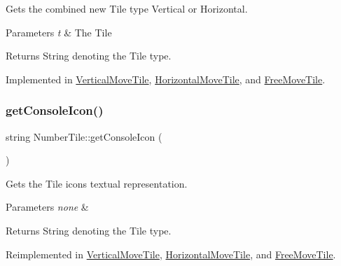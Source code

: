 Gets the combined new Tile type Vertical or Horizontal.


\begin{DoxyParams}{Parameters}
{\em t} & The Tile \\
\hline
\end{DoxyParams}
\begin{DoxyReturn}{Returns}
String denoting the Tile type. 
\end{DoxyReturn}


Implemented in \hyperlink{classVerticalMoveTile_a8a850a4df774c6132f20806ed531555a}{Vertical\+Move\+Tile}, \hyperlink{classHorizontalMoveTile_a90f17bebf2e3eb4ccdf20cd9b5c2bab6}{Horizontal\+Move\+Tile}, and \hyperlink{classFreeMoveTile_a4a0fa3466191647164cd39a5f4af4f29}{Free\+Move\+Tile}.

\mbox{\label{classNumberTile_a33a9dad43334d12c5b3842f1a45b1b66}} 
\subsubsection{\texorpdfstring{get\+Console\+Icon()}{getConsoleIcon()}}
{\footnotesize\ttfamily string Number\+Tile\+::get\+Console\+Icon (\begin{DoxyParamCaption}{ }\end{DoxyParamCaption})\hspace{0.3cm}{\ttfamily [virtual]}}

Gets the Tile icons textual representation.


\begin{DoxyParams}{Parameters}
{\em none} & \\
\hline
\end{DoxyParams}
\begin{DoxyReturn}{Returns}
String denoting the Tile type. 
\end{DoxyReturn}


Reimplemented in \hyperlink{classVerticalMoveTile_a0f313f3ba4d1cef0f91f7accd38a93ed}{Vertical\+Move\+Tile}, \hyperlink{classHorizontalMoveTile_a54bd2825da287bde0e9d1ab589c6af19}{Horizontal\+Move\+Tile}, and \hyperlink{classFreeMoveTile_a4cd6edaab63c439f1691300afb425c9a}{Free\+Move\+Tile}.

\mbox{\label{classNumberTile_aea8171fadfd8e145fdbbb8f0f757c52e}} 
